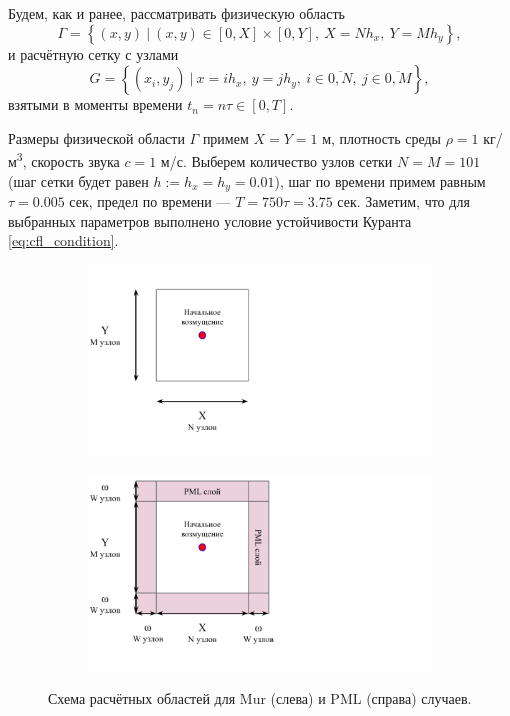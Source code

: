 Будем, как и ранее, рассматривать физическую область $$\Gamma = \left\{(x,y) ~|~ (x,y) \in [0,X]\times[0,Y],~ X=N h_x,~ Y=M h_y\right\},$$ и расчётную сетку с узлами $$G = \left\{(x_i,y_j) ~|~ x=ih_x, ~y=jh_y, ~i \in \overline{0,N},~ j \in \overline{0,M}\right\},$$ взятыми в моменты времени $t_n = n\tau \in [0,T]$.

Размеры физической области $\Gamma$ примем $X=Y=1$ м, плотность среды $\rho = 1$ кг/м\textsuperscript{3}, скорость звука $c=1$ м/с. Выберем количество узлов сетки $N=M=101$ (шаг сетки будет равен $h:=h_x=h_y=0.01$), шаг по времени примем равным $\tau = 0.005$ сек, предел по времени --- $T = 750\tau = 3.75$ сек. Заметим, что для выбранных параметров выполнено условие устойчивости Куранта \eqref{eq:cfl_condition}.

\begin{figure}[H]
    \centering
    \begin{subfigure}{0.45\textwidth}
        \centering
        \includegraphics[trim={0px 70px 435px 0px},clip,width=1.0\textwidth]{images/pml/exp_mur_scheme.png}
    \end{subfigure}
    \hspace{0.025\textwidth}
    \begin{subfigure}{0.45\textwidth}
        \centering
        \includegraphics[trim={0px 70px 435px 0px},clip,width=1.0\textwidth]{images/pml/exp_pml_scheme.png}
    \end{subfigure}
    \caption{Схема расчётных областей для Mur (слева) и PML (справа) случаев.}
    \label{fig:experiment_scheme}
\end{figure}

